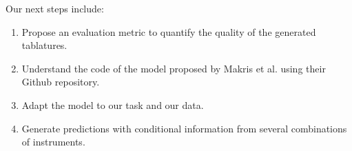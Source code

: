 
Our next steps include:
\begin{enumerate}
    \item Propose an evaluation metric to quantify the quality of the generated tablatures.
    \item Understand the code of the model proposed by Makris et al. using their Github repository.
    \item Adapt the model to our task and our data.
    \item Generate predictions with conditional information from several combinations of instruments.
\end{enumerate}